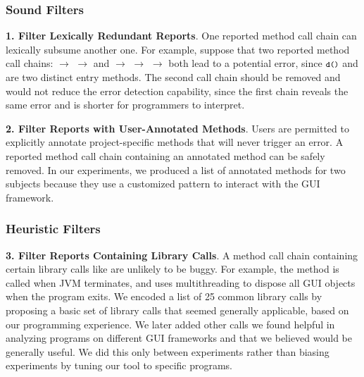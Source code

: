 



\subsubsection{Sound Filters}

\textbf{1. Filter Lexically Redundant Reports}. One reported method call
chain can lexically subsume another one. For example, suppose that two
reported method call chains:  $\rightarrow$ 
$\rightarrow$  and 
 $\rightarrow$  $\rightarrow$  $\rightarrow$ 
both lead to a potential error, since $\CodeIn{d()}$ and 
are two distinct entry methods. The second call chain should
be removed and would not reduce the error detection capability, since
the first chain reveals the same error and is shorter 
for programmers to interpret.


\textbf{2. Filter Reports with User-Annotated Methods}. Users are
permitted to explicitly annotate project-specific methods
that will never trigger an error.
A reported method call chain containing an annotated  method
can be safely removed. In our experiments, we produced a list of \filternum
annotated methods for two subjects because they use a customized
pattern to interact with the GUI framework.



\subsubsection{Heuristic Filters}

\textbf{3. Filter Reports Containing Library Calls}. A
method call chain containing certain library calls
like  are unlikely to
be buggy. For example, the 
method is called when JVM terminates, and uses multithreading
to dispose all GUI objects when the program exits.
We encoded a list of 25 common library calls by proposing
a basic set of library calls that seemed %
generally applicable, based on our programming experience.
We later added other calls we found helpful in analyzing
programs on different GUI frameworks and that we believed would be generally useful.
We did this only between experiments rather than biasing experiments by tuning
our tool to specific programs.

